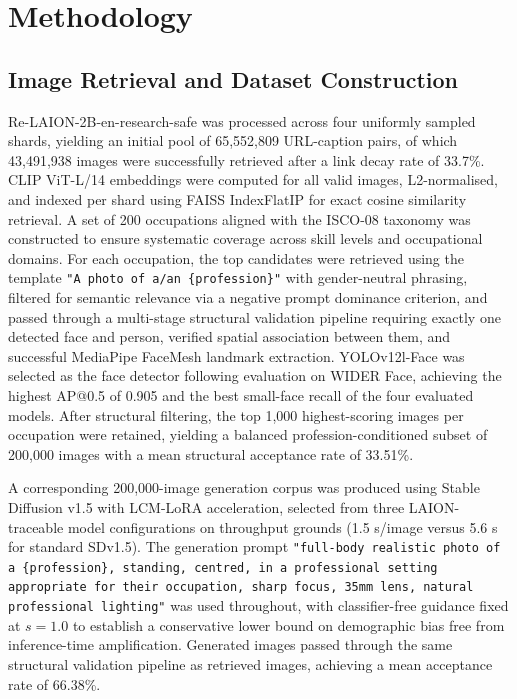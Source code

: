 \section{Methodology}

\subsection{Image Retrieval and Dataset Construction}

Re-LAION-2B-en-research-safe was processed across four uniformly sampled shards,
yielding an initial pool of 65,552,809 URL-caption pairs, of which 43,491,938 images
were successfully retrieved after a link decay rate of 33.7\%. CLIP ViT-L/14 embeddings
were computed for all valid images, L2-normalised, and indexed per shard using FAISS
IndexFlatIP for exact cosine similarity retrieval. A set of 200 occupations aligned with
the ISCO-08 taxonomy was constructed to ensure systematic coverage across skill levels
and occupational domains. For each occupation, the top candidates were retrieved using
the template \texttt{"A photo of a/an \{profession\}"} with gender-neutral phrasing,
filtered for semantic relevance via a negative prompt dominance criterion, and passed
through a multi-stage structural validation pipeline requiring exactly one detected face
and person, verified spatial association between them, and successful MediaPipe FaceMesh
landmark extraction. YOLOv12l-Face was selected as the face detector following
evaluation on WIDER Face, achieving the highest AP@0.5 of 0.905 and the best small-face
recall of the four evaluated models. After structural filtering, the top 1,000
highest-scoring images per occupation were retained, yielding a balanced
profession-conditioned subset of 200,000 images with a mean structural acceptance rate
of 33.51\%.

A corresponding 200,000-image generation corpus was produced using Stable Diffusion
v1.5 with LCM-LoRA acceleration, selected from three LAION-traceable model
configurations on throughput grounds (1.5 s/image versus 5.6 s for standard SDv1.5).
The generation prompt \texttt{"full-body realistic photo of a \{profession\}, standing, centred, in a professional setting appropriate for their occupation, sharp focus, 35mm lens, natural professional lighting"} was used throughout, with classifier-free guidance fixed at $s=1.0$ to establish a conservative lower bound on demographic bias free from
inference-time amplification. Generated images passed through the same structural
validation pipeline as retrieved images, achieving a mean acceptance rate of 66.38\%.

